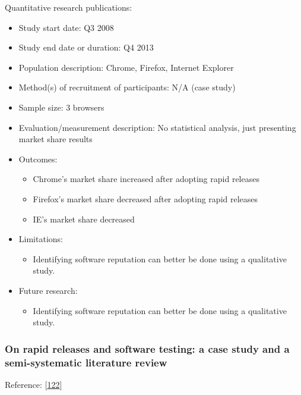 \documentclass[]{book}
\providecommand{\tightlist}{%
  \setlength{\itemsep}{0pt}\setlength{\parskip}{0pt}}
\begin{document}
Quantitative research publications:

\begin{itemize}
\tightlist
\item
  Study start date: Q3 2008
\item
  Study end date or duration: Q4 2013
\item
  Population description: Chrome, Firefox, Internet Explorer
\item
  Method(s) of recruitment of participants: N/A (case study)
\item
  Sample size: 3 browsers
\item
  Evaluation/measurement description: No statistical analysis, just
  presenting market share results
\item
  Outcomes:

  \begin{itemize}
  \tightlist
  \item
    Chrome's market share increased after adopting rapid releases
  \item
    Firefox's market share decreased after adopting rapid releases
  \item
    IE's market share decreased
  \end{itemize}
\item
  Limitations:

  \begin{itemize}
  \tightlist
  \item
    Identifying software reputation can better be done using a
    qualitative study.
  \end{itemize}
\item
  Future research:

  \begin{itemize}
  \tightlist
  \item
    Identifying software reputation can better be done using a
    qualitative study.
  \end{itemize}
\end{itemize}

\subsubsection{On rapid releases and software testing: a case study and
a semi-systematic literature
review}\label{on-rapid-releases-and-software-testing-a-case-study-and-a-semi-systematic-literature-review}

Reference: {[}\protect\hyperlink{ref-mantyla2015a}{122}{]}
\end{document}
